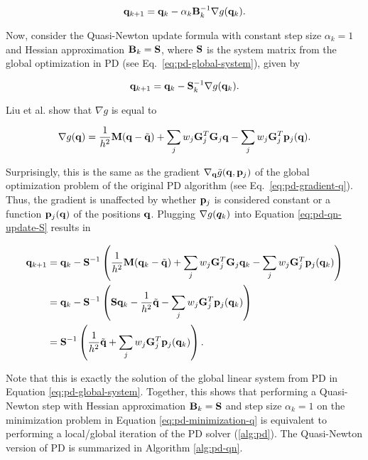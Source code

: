 \begin{equation}\label{eq:pd-qn-update}
    \mathbf{q}_{k+1} = \mathbf{q}_k - \alpha_k \mathbf{B}^{-1}_k \nabla g(\mathbf{q}_k).
\end{equation}

Now, consider the Quasi-Newton update formula with constant step size $\alpha_k = 1$ and Hessian approximation $\mathbf{B}_k = \mathbf{S}$, where $\mathbf{S}$
is the system matrix from the global optimization in PD (see Eq.\ \ref{eq:pd-global-system}), given by

\begin{equation}\label{eq:pd-qn-update-S}
    \mathbf{q}_{k+1} = \mathbf{q}_k - \mathbf{S}^{-1}_k \nabla g(\mathbf{q}_k).
\end{equation}

\noindent Liu et al. \cite{liu2017} show that $\nabla g$ is equal to

\begin{equation}\label{eq:pd-gradient-qn}
    \nabla g(\mathbf{q}) = \frac{1}{h^2}\mathbf{M}(\mathbf{q} - \tilde{\mathbf{q}}) + \sum_j w_j \mathbf{G}^T_j \mathbf{G}_j \mathbf{q}
    - \sum_j w_j \mathbf{G}^T_j \mathbf{p}_j(\mathbf{q}).
\end{equation}

\noindent Surprisingly, this is the same as the gradient $\nabla_{\mathbf{q}} \tilde{g}(\mathbf{q}, \mathbf{p}_j)$ of the global optimization problem of the original
PD algorithm (see Eq.\ \ref{eq:pd-gradient-q}). Thus, the gradient is unaffected by whether $\mathbf{p}_j$ is considered constant or a function
$\mathbf{p}_j(\mathbf{q})$ of the positions $\mathbf{q}$. Plugging $\nabla g(\bm{q}_k)$ into Equation \ref{eq:pd-qn-update-S} results in 

\begin{align*}
    \mathbf{q}_{k+1} &= \mathbf{q}_k - \mathbf{S}^{-1}\left(\frac{1}{h^2}\mathbf{M}(\mathbf{q}_k - \tilde{\mathbf{q}}) + \sum_j w_j \mathbf{G}^T_j \mathbf{G}_j \mathbf{q}_k
    - \sum_j w_j \mathbf{G}^T_j \mathbf{p}_j(\mathbf{q}_k)\right)\\
                   &= \mathbf{q}_k - \mathbf{S}^{-1}\left(\mathbf{S}\mathbf{q}_k - \frac{1}{h^2}\tilde{\mathbf{q}} - \sum_j w_j \mathbf{G}^T_j \mathbf{p}_j(\mathbf{q}_k)\right)\\
                   &= \mathbf{S}^{-1}\left(\frac{1}{h^2}\tilde{\mathbf{q}} + \sum_j w_j \mathbf{G}^T_j \mathbf{p}_j(\mathbf{q}_k)\right).
\end{align*}

\noindent Note that this is exactly the solution of the global linear system from PD in Equation \ref{eq:pd-global-system}. Together, this shows 
that performing a Quasi-Newton step with Hessian approximation $\mathbf{B}_k = \mathbf{S}$ and step size $\alpha_k = 1$ on the 
minimization problem in Equation \ref{eq:pd-minimization-q} is equivalent to performing a local/global iteration of the PD solver 
(\cref{alg:pd}). The Quasi-Newton version of PD is summarized in Algorithm \ref{alg:pd-qn}.

